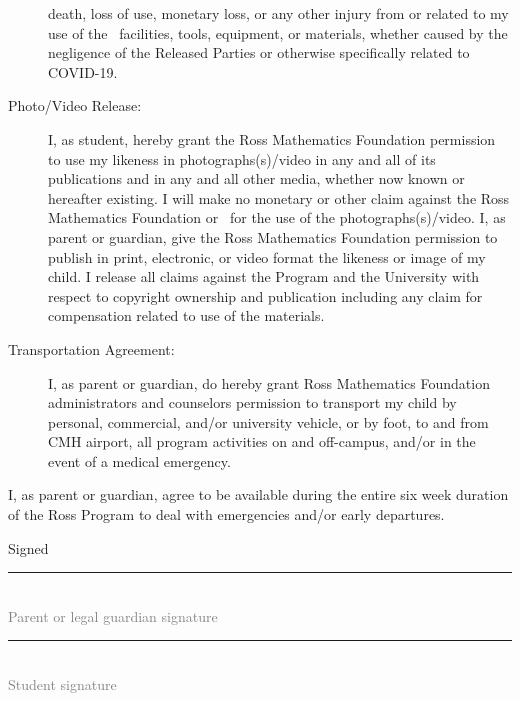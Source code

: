 \documentclass{ross}
\begin{document}
\begin{description}
death, loss of use, monetary loss, or any other injury from or related to my use of the \campus\ facilities,
tools, equipment, or materials, whether caused by the negligence of the Released Parties or otherwise specifically
related to COVID-19.
\item[Photo/Video Release:] I, as student, hereby grant the Ross
  Mathematics Foundation permission to use my likeness in
  photographs(s)/video in any and all of its publications and in any
  and all other media, whether now known or hereafter existing. I will
  make no monetary or other claim against the Ross Mathematics Foundation or
  \campus\ for the use of the photographs(s)/video. I, as parent or
  guardian, give the Ross Mathematics Foundation permission to publish in
  print, electronic, or video format the likeness or image of my
  child. I release all claims against the Program and the University
  with respect to copyright ownership and publication including any
  claim for compensation related to use of the materials.
\item[Transportation Agreement:] I, as parent or guardian, do hereby
  grant Ross Mathematics Foundation administrators and counselors
  permission to transport my child by personal, commercial, and/or
  university vehicle, or by foot, to and from CMH airport, all program
  activities on and off-campus, and/or in the event of a medical
  emergency.
\end{description}
I, as parent or guardian, agree to be available during the entire six
week duration of the Ross Program to deal with emergencies and/or early
departures.

\vspace{0.5in}
\hfill Signed \rule{3in}{0.1mm}\\[-1.5mm]
\hspace*{3.7in} {\footnotesize \textcolor{gray}{Parent or legal guardian signature} }


\vspace{0.5in}

\hfill  \rule{3in}{0.1mm}\\[-1.5mm]
\hspace*{3.7in} {\footnotesize \textcolor{gray}{Student signature} }


\end{document}
